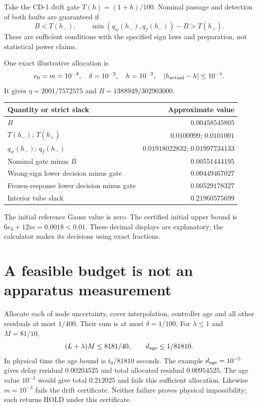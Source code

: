 \documentclass[10pt,a4paper]{article}
\begin{document}
Take the CD-1 drift gate $T(h)=(1+h)/100$. Nominal passage and detection of both faults are guaranteed if
\begin{equation}
B<T(h_-),\qquad
\min(q_w(h_-),q_f(h_-))-B>T(h_+).
\end{equation}
These are sufficient conditions with the specified sign laws and preparation, not statistical power claims.

One exact illustrative allocation is
\begin{equation}
e_0=m=10^{-4},\quad \delta=10^{-2},\quad
h=10^{-2},\quad |h_{\rm actual}-h|\leq10^{-5}.
\end{equation}
It gives $\eta=2001/7572575$ and $B=1388949/302903000$.
\begin{center}
\begin{tabular}{lr}
\toprule
Quantity or strict slack & Approximate value\\
\midrule
$B$ & $0.00458545805$\\
$T(h_-)$; $T(h_+)$ & $0.0100999$; $0.0101001$\\
$q_w(h_-)$; $q_f(h_-)$ & $0.01918022832$; $0.01997734133$\\
Nominal gate minus $B$ & $0.00551444195$\\
Wrong-sign lower decision minus gate & $0.00449467027$\\
Frozen-response lower decision minus gate & $0.00529178327$\\
Interior tube slack & $0.21960575699$\\
\bottomrule
\end{tabular}
\end{center}
The initial reference Gauss value is zero. The certified initial upper bound is $6e_0+12m=0.0018<0.01$. These decimal displays are explanatory; the calculator makes its decisions using exact fractions.

\section{A feasible budget is not an apparatus measurement}
Allocate each of node uncertainty, cover interpolation, controller age and all other residuals at most $1/400$. Their sum is at most $\delta=1/100$. For $\lambda\leq1$ and $M=81/10$,
\begin{equation}
(L+\lambda)M\leq8181/40,\qquad
d_{\rm age}\leq1/81810 .
\end{equation}
In physical time the age bound is $t_0/81810$ seconds. The example $d_{\rm age}=10^{-5}$ gives delay residual $0.00204525$ and total allocated residual $0.00954525$. The age value $10^{-3}$ would give total $0.212025$ and fails this sufficient allocation. Likewise $m=10^{-3}$ fails the drift certificate. Neither failure proves physical impossibility; each returns HOLD under this certificate.
\newpage
\end{document}
